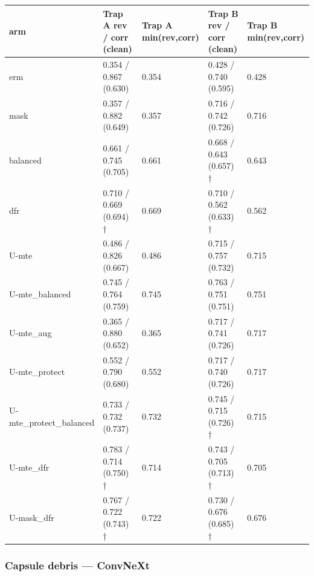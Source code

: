 {{ %
\begin{longtable}[]{@{}lllll@{}}
\toprule\noalign{}
arm & Trap A rev / corr (clean) & Trap A min(rev,corr) & Trap B rev / corr (clean) & Trap B min(rev,corr) \\
\midrule\noalign{}
\endhead
\bottomrule\noalign{}
\endlastfoot
erm & 0.354 / 0.867 (0.630) & 0.354 & 0.428 / 0.740 (0.595) & 0.428 \\
mask & 0.357 / 0.882 (0.649) & 0.357 & 0.716 / 0.742 (0.726) & 0.716 \\
balanced & 0.661 / 0.745 (0.705) & 0.661 & 0.668 / 0.643 (0.657) † & 0.643 \\
dfr & 0.710 / 0.669 (0.694) † & 0.669 & 0.710 / 0.562 (0.633) † & 0.562 \\
U-mte & 0.486 / 0.826 (0.667) & 0.486 & 0.715 / 0.757 (0.732) & 0.715 \\
U-mte\_balanced & 0.745 / 0.764 (0.759) & 0.745 & 0.763 / 0.751 (0.751) & 0.751 \\
U-mte\_aug & 0.365 / 0.880 (0.652) & 0.365 & 0.717 / 0.741 (0.726) & 0.717 \\
U-mte\_protect & 0.552 / 0.790 (0.680) & 0.552 & 0.717 / 0.740 (0.726) & 0.717 \\
U-mte\_protect\_balanced & 0.733 / 0.732 (0.737) & 0.732 & 0.745 / 0.715 (0.726) † & 0.715 \\
U-mte\_dfr & 0.783 / 0.714 (0.750) † & 0.714 & 0.743 / 0.705 (0.713) † & 0.705 \\
U-mask\_dfr & 0.767 / 0.722 (0.743) † & 0.722 & 0.730 / 0.676 (0.685) † & 0.676 \\
\end{longtable}
}

\subsubsection{Capsule debris --- ConvNeXt}\label{capsule-debris--convnext}

}
